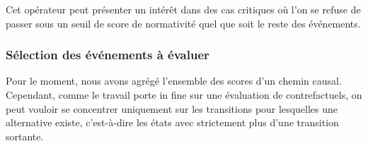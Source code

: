 Cet opérateur peut présenter un intérêt dans des cas critiques où l'on se refuse de passer sous un seuil de score de normativité quel que soit le reste des événements. 

\subsubsection{Sélection des événements à évaluer}

Pour le moment, nous avons agrégé l'ensemble des scores d'un chemin causal. Cependant, comme le travail porte in fine sur une évaluation de contrefactuels, on peut vouloir se concentrer uniquement sur les transitions pour lesquelles une alternative existe, c'est-à-dire les états avec strictement plus d'une transition sortante. 



